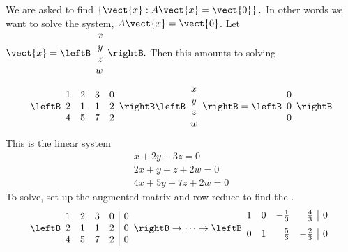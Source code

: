 \begin{solution}  We are asked to find $\left\{ \vect{x} : A\vect{x} = \vect{0}\right\} .$ In other
words we want to solve the system, $A\vect{x}=\vect{0}$. Let $\vect{x} =
\leftB
\begin{array}{r}
x \\
y \\
z \\
w
\end{array}
\rightB.$ Then this amounts to solving
\begin{equation*}
\leftB
\begin{array}{rrrr}
1 & 2 & 3 & 0 \\
2 & 1 & 1 & 2 \\
4 & 5 & 7 & 2
\end{array}
\rightB \leftB
\begin{array}{c}
x \\
y \\
z \\
w
\end{array}
\rightB =\leftB
\begin{array}{c}
0 \\
0 \\
0
\end{array}
\rightB
\end{equation*}
This is the linear system
\begin{equation*}
\begin{array}{c}
x+2y+3z=0 \\
2x+y+z+2w=0 \\
4x+5y+7z+2w=0
\end{array}
\end{equation*}
To solve, set up the augmented matrix and row reduce to find the \rref.
\begin{equation*}
\leftB
\begin{array}{rrrr|r}
1 & 2 & 3 & 0 & 0 \\
2 & 1 & 1 & 2 & 0 \\
4 & 5 & 7 & 2 & 0
\end{array}
\rightB
\rightarrow \cdots \rightarrow
\leftB
\begin{array}{rrrr|r}
1 & 0 & -
\vspace{0.05in}\frac{1}{3} & \vspace{0.05in}\frac{4}{3} &  0 \\
0 & 1 & \vspace{0.05in}\frac{5}{3} & -\vspace{0.05in}\frac{2}{3} & 0 \\

\end{array}
\end{equation*}
\end{solution}
